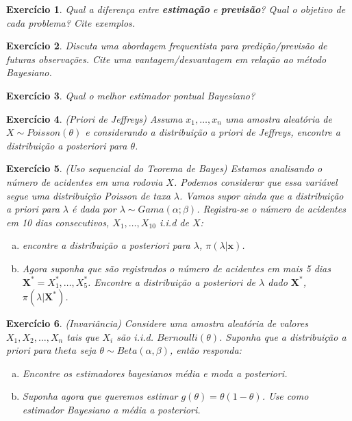 \documentclass[letter,11pt]{article}
\newtheorem{exer}{Exercício}
\begin{document}
\bigskip
\begin{exer} \rm
Qual a diferença entre \textbf{estimação} e \textbf{previsão}? Qual o objetivo de cada problema? Cite exemplos.
\end{exer}


\bigskip
\begin{exer} \rm
Discuta uma abordagem frequentista para predição/previsão de futuras observações. Cite uma vantagem/desvantagem em relação ao método Bayesiano.
\end{exer}


\bigskip
\begin{exer} \rm  
Qual o melhor estimador pontual Bayesiano?
\end{exer}


\bigskip
\begin{exer} \rm (Priori de Jeffreys)  
Assuma $x_1, \ldots, x_n$ uma amostra aleatória de $X \sim Poisson(\theta)$ e considerando a distribuição \textit{a priori} de Jeffreys, encontre a distribuição \textit{a posteriori} para $\theta$.  
\end{exer}



\bigskip
\begin{exer} \rm (Uso sequencial do Teorema de Bayes)  
Estamos analisando o número de acidentes em uma rodovia $X$. Podemos considerar que essa variável segue uma distribuição Poisson de taxa $\lambda$. Vamos supor ainda que a distribuição \textit{a priori} para $\lambda$ é dada por $\lambda \sim Gama(\alpha; \beta)$. Registra-se o número de acidentes em 10 dias consecutivos, $X_1, \ldots, X_{10}$ i.i.d de $X$:
\begin{enumerate}[a)]
  \item encontre a distribuição \textit{a posteriori} para $\lambda$, $\pi(\lambda \vert \boldsymbol{x})$.
  \item Agora suponha que são registrados o número de acidentes em mais 5 dias $\boldsymbol{X^*} = X^*_1,\ldots, X^*_5$. Encontre a distribuição \textit{a posteriori} de $\lambda$ dado $\boldsymbol{X^*}$, $\pi(\lambda \vert \boldsymbol{X^*})$.
\end{enumerate}
\end{exer}
  

\bigskip
\begin{exer} \rm (Invariância)
Considere uma amostra aleatória de valores $X_1, X_2, \ldots, X_n$ tais que $X_i$ são i.i.d. $Bernoulli(\theta)$. Suponha que a distribuição \textit{a priori} para $theta$ seja $\theta \sim Beta(\alpha, \beta)$, então responda:
\begin{enumerate}[a)]
  \item Encontre os estimadores bayesianos média e moda \textit{a posteriori}.
  \item Suponha agora que queremos estimar $g(\theta) = \theta (1-\theta)$. Use como estimador Bayesiano a média \textit{a posteriori}.
\end{enumerate}
\end{exer}
  
\end{document}
